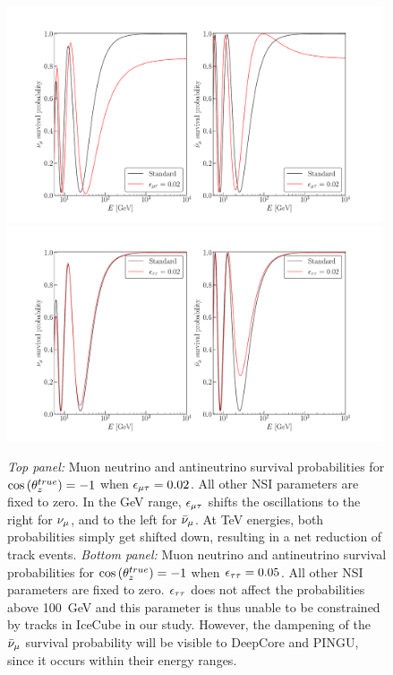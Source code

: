 \begin{figure}
    \begin{center}
        \includegraphics[width=0.99\textwidth]{figures/Pmm_emt_probs.pdf}
        \includegraphics[width=0.99\textwidth]{figures/Pmm_ett_probs.pdf}
        \caption{\emph{Top panel:} Muon neutrino and antineutrino survival probabilities for
        $\cos{(\theta_z^{true})} = -1$ when $\epsilon_{\mu\tau} = 0.02$. All other NSI parameters are fixed to zero. In the \si{\GeV} range, $\epsilon_{\mu\tau}$ shifts the oscillations to the right for $\nu_\mu$, and to the left for $\bar{\nu}_\mu$. At \si{\TeV} energies, both probabilities simply get shifted down, resulting in a net reduction of track events.
        \emph{Bottom panel:} Muon neutrino and antineutrino survival probabilities for
        $\cos{(\theta_z^{true})} = -1$ when $\epsilon_{\tau\tau} = 0.05$. All other NSI parameters are fixed to zero. $\epsilon_{\tau\tau}$ does not affect the probabilities above \SI{100}{\GeV} and this parameter is thus unable to be constrained by tracks in IceCube in our study. However, the dampening of the $\bar{\nu}_\mu$ survival probability will be visible to DeepCore and PINGU, since it occurs within their energy ranges.}
        \label{fig:emt_ett_probs}
    \end{center}
\end{figure}


